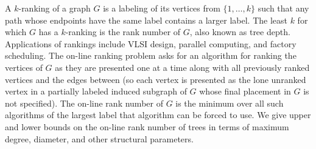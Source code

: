 \endtitle

A $k$-ranking of a graph $G$ is a labeling of its vertices from $\{1,\ldots,k\}$ such that any path whose endpoints have the same label contains a larger label.  The least $k$ for which $G$ has a $k$-ranking is the rank number of $G$, also known as tree depth.  Applications of rankings include VLSI design, parallel computing, and factory scheduling. The on-line ranking problem asks for an algorithm for ranking the vertices of $G$ as they are presented one at a time along with all previously ranked vertices and the edges between (so each vertex is presented as the lone unranked vertex in a partially labeled induced subgraph of $G$ whose final placement in $G$ is not specified).  The on-line rank number of $G$ is the minimum over all such algorithms of the largest label that algorithm can be forced to use.  We give upper and lower bounds on the on-line rank number of trees in terms of maximum degree, diameter, and other structural parameters.